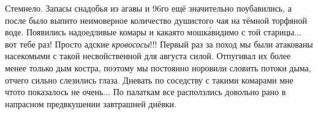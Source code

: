 Стемнело. Запасы снадобья из агавы и 96\sdash го ещё значительно поубавились, а после было выпито неимоверное количество душистого чая на тёмной торфяной воде. Появились надоедливые комары и какая\sdash то мошк\'{а}\mdash  видимо с той старицы$\ldots$ вот тебе раз! Просто адские \textit{кровососы}!!! Первый раз за поход мы были атакованы насекомыми с такой несвойственной для августа силой. Отпугивал их более менее только дым костра, поэтому мы постоянно норовили словить потоки дыма, отчего сильно слезились глаза. Дневать по соседству с такими комарами мне что\sdash то показалось не очень$\ldots$ По палаткам все расползлись довольно рано в напрасном предвкушении завтрашней днёвки. 

\begin{center}
\end{center}
